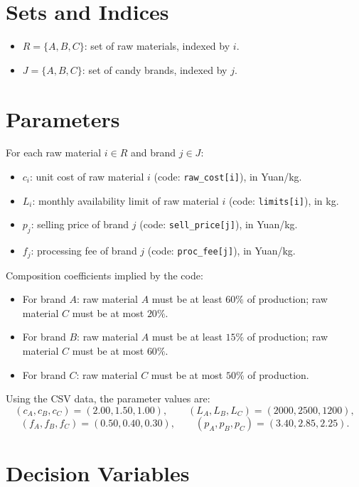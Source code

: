 \section*{Sets and Indices}

\begin{itemize}
    \item $R=\{A,B,C\}$: set of raw materials, indexed by $i$.
    \item $J=\{A,B,C\}$: set of candy brands, indexed by $j$.
\end{itemize}

\section*{Parameters}

For each raw material $i \in R$ and brand $j \in J$:

\begin{itemize}
    \item $c_i$: unit cost of raw material $i$ (code: \texttt{raw\_cost[i]}), in Yuan/kg.
    \item $L_i$: monthly availability limit of raw material $i$ (code: \texttt{limits[i]}), in kg.
    \item $p_j$: selling price of brand $j$ (code: \texttt{sell\_price[j]}), in Yuan/kg.
    \item $f_j$: processing fee of brand $j$ (code: \texttt{proc\_fee[j]}), in Yuan/kg.
\end{itemize}

Composition coefficients implied by the code:

\begin{itemize}
    \item For brand $A$: raw material $A$ must be at least $60\%$ of production; raw material $C$ must be at most $20\%$.
    \item For brand $B$: raw material $A$ must be at least $15\%$ of production; raw material $C$ must be at most $60\%$.
    \item For brand $C$: raw material $C$ must be at most $50\%$ of production.
\end{itemize}

Using the CSV data, the parameter values are:
\[
(c_A,c_B,c_C)=(2.00,1.50,1.00),
\qquad
(L_A,L_B,L_C)=(2000,2500,1200),
\]
\[
(f_A,f_B,f_C)=(0.50,0.40,0.30),
\qquad
(p_A,p_B,p_C)=(3.40,2.85,2.25).
\]

\section*{Decision Variables}

